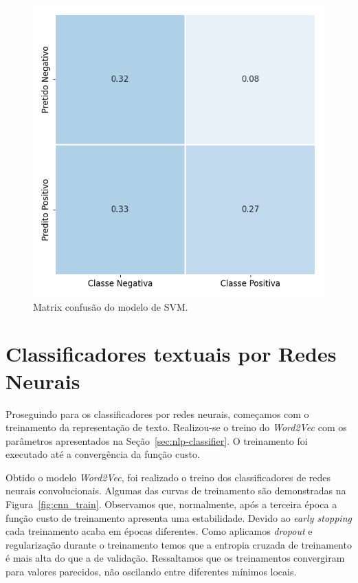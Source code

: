 \begin{figure}[h]
\begin{center} {
    \begin{center}
    \includegraphics[scale=0.65]{images/svm_cm.png}
    \caption{Matrix confusão do modelo de SVM.}
    \label{fig:svm_confusion}
    \end{center}
}
\end{center}
\end{figure}



\section{Classificadores textuais por Redes Neurais}

Proseguindo para os classificadores por redes neurais, começamos com o
treinamento da representação de texto.
Realizou-se o treino do \textit{Word2Vec} com os parâmetros
apresentados na Seção~\ref{sec:nlp-classifier}.
O treinamento foi executado até a convergência da função custo.

Obtido o modelo \textit{Word2Vec}, foi realizado o treino dos classificadores de
redes neurais convolucionais.
Algumas das curvas de treinamento são demonstradas na Figura~\ref{fig:cnn_train}.
Observamos que, normalmente, após a terceira época a função custo de treinamento
apresenta uma estabilidade.
Devido ao \textit{early stopping} cada treinamento acaba em épocas diferentes.
Como aplicamos \textit{dropout} e regularização durante o treinamento temos que
a entropia cruzada de treinamento é mais alta do que a de validação.
Ressaltamos que os treinamentos convergiram para valores parecidos, não
oscilando entre diferentes mínimos locais.

